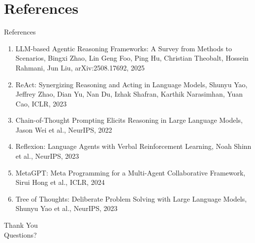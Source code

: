 \documentclass[10pt]{beamer}
\begin{document}
\section{References}
\begin{frame}[allowframebreaks]{References}
  \footnotesize
  \begin{enumerate}
    \item LLM-based Agentic Reasoning Frameworks: A Survey from Methods to Scenarios, Bingxi Zhao, Lin Geng Foo, Ping Hu, Christian Theobalt, Hossein Rahmani, Jun Liu, arXiv:2508.17692, 2025
    \item ReAct: Synergizing Reasoning and Acting in Language Models, Shunyu Yao, Jeffrey Zhao, Dian Yu, Nan Du, Izhak Shafran, Karthik Narasimhan, Yuan Cao, ICLR, 2023
    \item Chain-of-Thought Prompting Elicits Reasoning in Large Language Models, Jason Wei et al., NeurIPS, 2022
    \item Reflexion: Language Agents with Verbal Reinforcement Learning, Noah Shinn et al., NeurIPS, 2023
    \item MetaGPT: Meta Programming for a Multi-Agent Collaborative Framework, Sirui Hong et al., ICLR, 2024
    \item Tree of Thoughts: Deliberate Problem Solving with Large Language Models, Shunyu Yao et al., NeurIPS, 2023
  \end{enumerate}
\end{frame}

\begin{frame}[plain]
  \begin{center}
    {\Huge Thank You}\\[1em]
    {\large Questions?}
  \end{center}
\end{frame}
\end{document}
